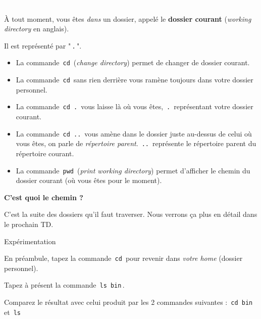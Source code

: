 \documentclass[a4paper,11pt]{article}
\begin{document}
\textcolor{white}{.} \par
				
\par
        
\`A tout moment, vous \^etes \textit{dans} un dossier, appel\'e le \textbf{dossier courant} (\textit{working directory} en anglais).
				
 \par
        
Il est repr\'esent\'e par "\,\verb|.|\,".
				
\par
        
\begin{itemize}
\item La commande \,\verb|cd|\, (\textit{change directory}) permet de changer de dossier courant.
\item La commande \,\verb|cd|\, sans rien derri\`ere vous ram\`ene toujours dans votre dossier personnel.
\item La commande \,\verb|cd .|\, vous laisse l\`a o\`u vous \^etes, \,\verb|.|\, repr\'esentant votre dossier courant.
\item La commande \,\verb|cd ..|\, vous am\`ene dans le dossier juste au-dessus de celui o\`u vous \^etes, on parle de \textit{r\'epertoire parent}. \,\verb|..|\, repr\'esente le r\'epertoire parent du r\'epertoire courant.
\item La commande \,\verb|pwd|\, (\textit{print working directory}) permet d'afficher le chemin du dossier courant (o\`u vous \^etes pour le moment).
\end{itemize}
\textbf{C'est quoi le chemin ?}
\par
C'est la suite des dossiers qu'il faut traverser. Nous verrons \c ca plus en d\'etail dans le prochain TD.
				
\par
        
\begin{Tutoriel}{Exp\'erimentation}      
\begin{steps}
				
\item En pr\'eambule, tapez la commande \,\verb|cd|\, pour revenir dans \textit{votre home} (dossier personnel).
\item Tapez \`a pr\'esent la commande \,\verb|ls bin|\,.
\item Comparez le r\'esultat avec celui produit par les 2 commandes suivantes : \,\verb|cd bin|\, et \,\verb|ls|\,
\end{steps}
\end{Tutoriel}				
			
\end{document}
